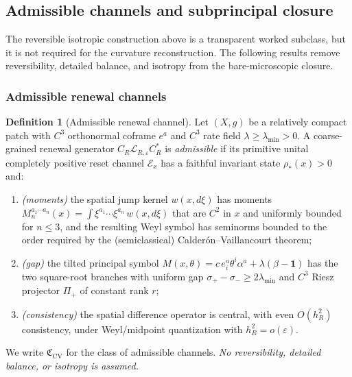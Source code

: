 \documentclass[11pt]{article}
\theoremstyle{definition}
\newtheorem{definition}[theorem]{Definition}
\theoremstyle{remark}
\newcommand{\eps}{\varepsilon}
\newcommand{\Lcal}{\mathcal L}
\newcommand{\rstar}{\rho_*}
\newcommand{\CV}{\mathfrak C_{\mathrm{CV}}}
\newcommand{\Pip}{\Pi_+}
\begin{document}
\subsection{Admissible channels and subprincipal closure}
\label{subsec:unconditional-microscopic-closure}

The reversible isotropic construction above is a transparent worked subclass, but it is not required for the curvature reconstruction.  The following results remove reversibility, detailed balance, and isotropy from the bare-microscopic closure.

\subsubsection{Admissible renewal channels}
\label{sec:class}

\begin{definition}[Admissible renewal channel]
\label{def:admissible-renewal-channel}
Let $(X,g)$ be a relatively compact patch with $C^3$ orthonormal coframe $e^a$
and $C^3$ rate field $\lambda\ge\lambda_{\min}>0$.  A coarse-grained renewal
generator $C_R\Lcal_{R,\eps}C_R^*$ is \emph{admissible} if its primitive unital
completely positive reset channel $\mathcal E_x$ has a faithful invariant state
$\rstar(x)>0$ and:
\begin{enumerate}[leftmargin=2.6em]
\item[\textup{(A1)}] \emph{(moments)} the spatial jump kernel $w(x,d\xi)$ has
moments $M_n^{a_1\cdots a_n}(x)=\int\xi^{a_1}\cdots\xi^{a_n}\,w(x,d\xi)$ that are
$C^2$ in $x$ and uniformly bounded for $n\le 3$, and the resulting Weyl symbol has
seminorms bounded to the order required by the (semiclassical)
Calder\'on--Vaillancourt theorem;
\item[\textup{(A2)}] \emph{(gap)} the tilted principal symbol
$M(x,\theta)=c\,e^a_i\theta^i\alpha^a+\lambda(\beta-\mathbf1)$ has the two
square-root branches with uniform gap $\sigma_+-\sigma_-\ge2\lambda_{\min}$ and
$C^3$ Riesz projector $\Pip$ of constant rank $r$;
\item[\textup{(A3)}] \emph{(consistency)} the spatial difference operator is
central, with even $O(h_R^2)$ consistency, under Weyl/midpoint quantization with
$h_R^2=o(\eps)$.
\end{enumerate}
We write $\CV$ for the class of admissible channels.  \emph{No reversibility,
detailed balance, or isotropy is assumed.}
\end{definition}
\end{document}
